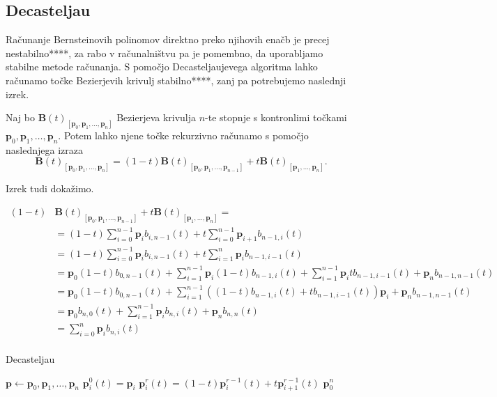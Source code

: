 \documentclass[isrm2, tisk]{fmfdelo}
\newcommand{\p}{\textbf{p}}
\newcommand{\lilb}[2]{b_{#1,#2}(t)}
\newcommand{\bigbbt}{\textbf{B}(t)}
\newcommand{\bernsteinsump}[2]{\sum_{#1=0}^{#2} \p_{#1}\lilb{#1}{#2}}
\begin{document}
    \subsection{Decasteljau}
    Računanje Bernsteinovih polinomov direktno preko njihovih enačb je precej nestabilno****, za rabo v računalništvu pa je pomembno, da uporabljamo stabilne metode računanja.
    S pomočjo Decasteljaujevega algoritma lahko računamo točke Bezierjevih krivulj stabilno****, zanj pa potrebujemo naslednji izrek.

    \begin{izrek}
        Naj bo $\bigbbt_{[\p_0,\p_1,\dots,\p_n]}$ Bezierjeva krivulja $n$-te stopnje s kontronlimi točkami $\p_0,\p_1,\dots,\p_n$.
        Potem lahko njene točke rekurzivno računamo s pomočjo naslednjega izraza \[\bigbbt_{[\p_0,\p_1,\dots,\p_n]} = (1-t)\bigbbt_{[\p_0,\p_1,\dots,\p_{n-1}]} +t\bigbbt_{[\p_1,\dots,\p_n]}.\]
    \end{izrek}

    Izrek tudi dokažimo.

    \begin{dokaz}
        \begin{align*}
        (1-t) &
            \bigbbt_{[\p_0,\p_1,\dots,\p_{n-1}]}+t\bigbbt_{[\p_1,\dots,\p_n]} = \\
            &= (1-t)\bernsteinsump{i}{n-1}+t\sum_{i=0}^{n-1} \p_{i+1}\lilb{n-1}{i} \\
            &= (1-t)\bernsteinsump{i}{n-1}+ t\sum_{i=1}^{n} \p_{i}\lilb{n-1}{i-1} \\
            &= \p_0(1-t)\lilb{0}{n-1} + \sum_{i=1}^{n-1}\p_{i}(1-t)\lilb{n-1}{i} +  \sum_{i=1}^{n-1} \p_{i}t\lilb{n-1}{i-1} + \p_n \lilb{n-1}{n-1} \\
        &= \p_0(1-t)\lilb{0}{n-1} + \sum_{i=1}^{n-1}\left((1-t)\lilb{n-1}{i} + t\lilb{n-1}{i-1}\right)\p_{i} + \p_n \lilb{n-1}{n-1} \\
        &= \p_0\lilb{n}{0} + \sum_{i=1}^{n-1}\p_{i}\lilb{n}{i} + \p_n \lilb{n}{n} \\
        &= \sum_{i=0}^{n}\p_{i}\lilb{n}{i} \\
        \end{align*}
    \end{dokaz}
    \begin{algorithm}
        \caption{Decasteljau}
        \begin{algorithmic}
            \State $\p \gets \p_0,\p_1,\dots,\p_n$
                \State $\p_i^0(t)=\p_i$
            \EndFor
                    \State $\p_i^r(t)=(1-t)\p_i^{r-1}(t)+t\p_{i+1}^{r-1}(t)$
                \EndFor
            \EndFor
            \State \Return $\p_0^n$
        \end{algorithmic}
    \end{algorithm}
\end{document}
